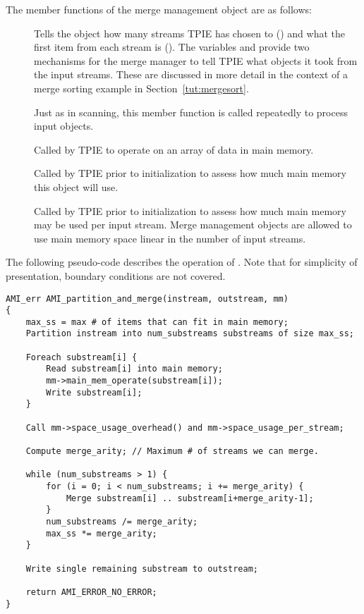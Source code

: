 The member functions of the merge management object
 are as follows:

\begin{description}
    \item[] Tells the object how many
    streams TPIE has chosen to () and what the
    first item from each stream is (). The
    variables  and
     provide two mechanisms for the
    merge manager to tell TPIE what objects it took from the
    input streams. These are discussed in more detail in the
    context of a merge sorting example in
    Section~\ref{tut:mergesort}.
    \item[] Just as in scanning, this
    member function is called repeatedly to process input
    objects.
    \item[] Called by TPIE to
    operate on an array of data in main memory.
    \item[] Called by TPIE
    prior to initialization to assess how much main memory
    this object will use.
    \item[] Called by TPIE
    prior to initialization to assess how much main memory
    may be used per input stream. Merge management objects
    are allowed to use main memory space linear in the
    number of input streams.
\end{description}

The following pseudo-code describes the operation of
.  Note that for
simplicity of presentation, boundary conditions are not
covered.

\begin{verbatim}
AMI_err AMI_partition_and_merge(instream, outstream, mm)
{
    max_ss = max # of items that can fit in main memory;
    Partition instream into num_substreams substreams of size max_ss;

    Foreach substream[i] {
        Read substream[i] into main memory;
        mm->main_mem_operate(substream[i]);
        Write substream[i];
    }

    Call mm->space_usage_overhead() and mm->space_usage_per_stream;
    
    Compute merge_arity; // Maximum # of streams we can merge.     

    while (num_substreams > 1) {
        for (i = 0; i < num_substreams; i += merge_arity) {
            Merge substream[i] .. substream[i+merge_arity-1];
        }
        num_substreams /= merge_arity;
        max_ss *= merge_arity;
    }

    Write single remaining substream to outstream;
        
    return AMI_ERROR_NO_ERROR;
}
\end{verbatim}


